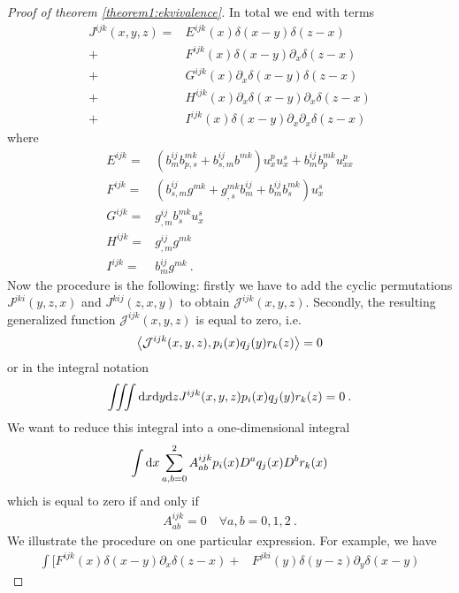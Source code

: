 \begin{proof}[Proof of theorem \ref{theorem1:ekvivalence}]
    In total we end with terms
    \begin{align}
        J^{ijk}(x,y,z) =& 
        E^{ijk}(x) \delta(x-y) \delta(z-x) 
        \\+& F^{ijk}(x) \delta(x-y) \partial_x \delta(z-x) 
        \\+& G^{ijk}(x) \partial_x \delta(x-y) \delta (z-x) 
        \\+& H^{ijk}(x) \partial_x \delta(x-y) \partial_x \delta (z-x) 
        \\+& I^{ijk}(x) \delta(x-y) \partial_x \partial_x \delta (z-x)
    \end{align}
    where
    \begin{align}
        E^{ijk} =& (b^{ij}_m b^{mk}_{p,s} + b^{ij}_{s,m} b^{mk} ) u^p_x u^s_x + b^{ij}_m b^{mk}_p u^p_{xx} \\
        F^{ijk} =& (b^{ij}_{s,m} g^{mk} + g^{mk}_{,s} b^{ij}_m + b^{ij}_m b^{mk}_s)u_x^s \\
        G^{ijk} =& g^{ij}_{,m} b^{mk}_s u^s_x \\
        H^{ijk} =& g^{ij}_{,m} g^{mk} \\
        I^{ijk} =& b^{ij}_m g^{mk} \:.
    \end{align}
    Now the procedure is the following: firstly we have to add the cyclic permutations $J^{jki}(y,z,x)$ and $J^{kij}(z,x,y)$ to obtain $\mathcal J^{ijk}(x,y,z)$. Secondly, the resulting generalized function $\mathcal J^{ijk}(x,y,z)$ is equal to zero, i.e.
    \begin{align*}
        \left \langle \mathcal J^{ijk}(x,y,z) ,p_i(x)q_j(y)r_k(z) \right \rangle = 0
    \end{align*}
    or in the integral notation 
    \begin{align*}
        \iiint \mathrm{d} x \mathrm{d} y \mathrm{d} z J^{ijk}(x,y,z) p_i(x)q_j(y)r_k(z) = 0 \:.
    \end{align*}
    We want to reduce this integral into a one-dimensional integral
    \begin{align*}
        \int \mathrm{d} x \sum_{a,b = 0}^2 A^{ijk}_{ab} p_i(x) D^a q_j(x) D^b r_k (x)
    \end{align*}
    which is equal to zero if and only if
    \begin{align*}
        A^{ijk}_{ab} = 0 \quad \forall a,b = 0,1,2 \:.
    \end{align*}
    We illustrate the procedure on one particular expression. For example, we have
    \begin{align*}
        \int \big[ F^{ijk}(x) \delta(x-y) \partial_x \delta(z-x) 
        +& F^{jki}(y) \delta(y-z) \partial_y \delta(x-y) 

\end{align*}
\end{proof}
